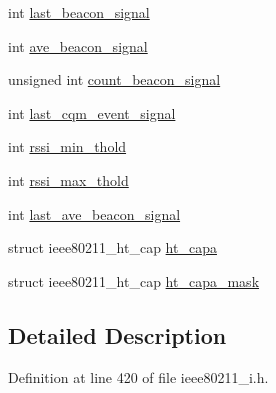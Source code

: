 \begin{DoxyCompactItemize}
\item 
int \hyperlink{structieee80211__if__managed_a2cb78bcdf63c4c28095302c2570c89c1}{last\-\_\-beacon\-\_\-signal}
\item 
int \hyperlink{structieee80211__if__managed_a1ca783bf10e019313e237620d1dab5b1}{ave\-\_\-beacon\-\_\-signal}
\item 
unsigned int \hyperlink{structieee80211__if__managed_a896df829a69357f4258722027c1dbc6d}{count\-\_\-beacon\-\_\-signal}
\item 
int \hyperlink{structieee80211__if__managed_ad0b63098dcdc5575332f354e99fec846}{last\-\_\-cqm\-\_\-event\-\_\-signal}
\item 
int \hyperlink{structieee80211__if__managed_a2f1dcd8ee0579b994cf73bb848b9474f}{rssi\-\_\-min\-\_\-thold}
\item 
int \hyperlink{structieee80211__if__managed_af252cdc03f2874e5289acdd9b973fb1d}{rssi\-\_\-max\-\_\-thold}
\item 
int \hyperlink{structieee80211__if__managed_a74da56491351b6b4b406a63bfcb3d154}{last\-\_\-ave\-\_\-beacon\-\_\-signal}
\item 
struct ieee80211\-\_\-ht\-\_\-cap \hyperlink{structieee80211__if__managed_ac49151818a5396f2513b2cf6f135e988}{ht\-\_\-capa}
\item 
struct ieee80211\-\_\-ht\-\_\-cap \hyperlink{structieee80211__if__managed_a33ba3774e4e37a83cef9b63d23b4dc29}{ht\-\_\-capa\-\_\-mask}
\end{DoxyCompactItemize}


\subsection{Detailed Description}


Definition at line 420 of file ieee80211\-\_\-i.\-h.




